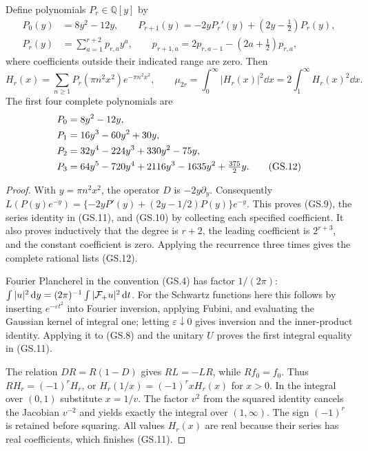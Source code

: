 \begin{theorem}
Define polynomials $P_r\in\mathbb Q[y]$ by
\begin{align}
 P_0(y)&=8y^2-12y,\qquad
 P_{r+1}(y)=-2yP_r'(y)+(2y-\tfrac12)P_r(y),\tag{GS.9}\\
 P_r(y)&=\sum_{a=1}^{r+2}p_{r,a}y^a,\qquad
 p_{r+1,a}=2p_{r,a-1}-(2a+\tfrac12)p_{r,a},\tag{GS.10}
\end{align}
where coefficients outside their indicated range are zero. Then
\begin{equation}
 H_r(x)=\sum_{n\ge1}P_r(\pi n^2x^2)e^{-\pi n^2x^2},\qquad
 \mu_{2r}=\int_0^\infty |H_r(x)|^2\dd x
          =2\int_1^\infty H_r(x)^2\dd x.\tag{GS.11}
\end{equation}
The first four complete polynomials are
\begin{align}
 P_0&=8y^2-12y,\notag\\
 P_1&=16y^3-60y^2+30y,\notag\\
 P_2&=32y^4-224y^3+330y^2-75y,\notag\\
 P_3&=64y^5-720y^4+2116y^3-1635y^2+\tfrac{375}{2}y.
 \tag{GS.12}
\end{align}
\end{theorem}
\begin{proof}
With $y=\pi n^2x^2$, the operator $D$ is $-2y\partial_y$.
Consequently
$L(P(y)e^{-y})=\{-2yP'(y)+(2y-1/2)P(y)\}e^{-y}$.
This proves (GS.9), the series identity in (GS.11), and (GS.10)
by collecting each specified coefficient. It also proves inductively
that the degree is $r+2$, the leading coefficient is $2^{r+3}$,
and the constant coefficient is zero. Applying the recurrence three
times gives the complete rational lists (GS.12).

Fourier Plancherel in the convention (GS.4) has factor $1/(2\pi)$:
$\int|u|^2\,\mathrm d y=(2\pi)^{-1}\int|\mathcal F_+u|^2\,\mathrm d t$.
For the Schwartz functions here this follows by inserting
$e^{-\varepsilon t^2}$ into Fourier inversion, applying Fubini,
and evaluating the Gaussian kernel of integral one; letting
$\varepsilon\downarrow0$ gives inversion and the inner-product
identity. Applying it to (GS.8) and the unitary $U$ proves the
first integral equality in (GS.11).

The relation $DR=R(1-D)$ gives $RL=-LR$, while $Rf_0=f_0$.
Thus $RH_r=(-1)^rH_r$, or
$H_r(1/x)=(-1)^r xH_r(x)$ for $x>0$. In the integral over
$(0,1)$ substitute $x=1/v$. The factor $v^2$ from the squared
identity cancels the Jacobian $v^{-2}$ and yields exactly the
integral over $(1,\infty)$. The sign $(-1)^r$ is retained before
squaring. All values $H_r(x)$ are real because their series has
real coefficients, which finishes (GS.11).
\end{proof}

